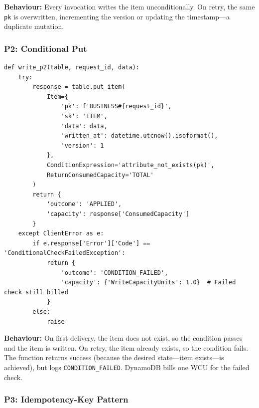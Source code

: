 \textbf{Behaviour:} Every invocation writes the item unconditionally. On retry, the same \texttt{pk} is overwritten, incrementing the version or updating the timestamp---a duplicate mutation.

\subsubsection{P2: Conditional Put}

\begin{verbatim}
def write_p2(table, request_id, data):
    try:
        response = table.put_item(
            Item={
                'pk': f'BUSINESS#{request_id}',
                'sk': 'ITEM',
                'data': data,
                'written_at': datetime.utcnow().isoformat(),
                'version': 1
            },
            ConditionExpression='attribute_not_exists(pk)',
            ReturnConsumedCapacity='TOTAL'
        )
        return {
            'outcome': 'APPLIED',
            'capacity': response['ConsumedCapacity']
        }
    except ClientError as e:
        if e.response['Error']['Code'] == 'ConditionalCheckFailedException':
            return {
                'outcome': 'CONDITION_FAILED',
                'capacity': {'WriteCapacityUnits': 1.0}  # Failed check still billed
            }
        else:
            raise
\end{verbatim}

\textbf{Behaviour:} On first delivery, the item does not exist, so the condition passes and the item is written. On retry, the item already exists, so the condition fails. The function returns success (because the desired state---item exists---is achieved), but logs \texttt{CONDITION\_FAILED}. DynamoDB bills one WCU for the failed check.

\subsubsection{P3: Idempotency-Key Pattern}

